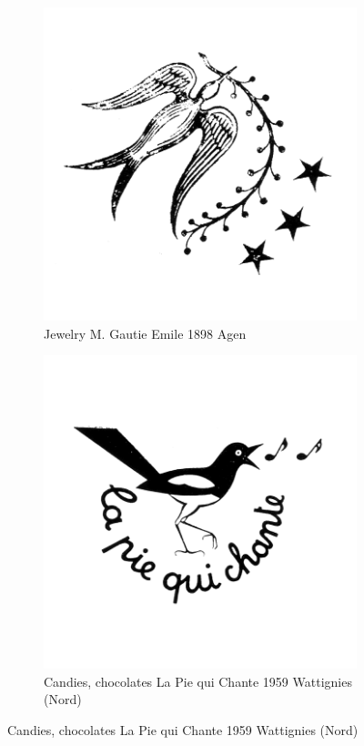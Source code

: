 \begin{figure}[h]
  \begin{subfigure}{.45\textwidth}
    \centering
    \includegraphics[width=.5\linewidth]{images/supplement/trademarks/french/12_2}
    \caption[]{Jewelry M. Gautie Emile 1898 Agen}
    \label{fig:trademarks:french:12.2}
  \end{subfigure}\hfill
  \begin{subfigure}{.45\textwidth}
    \centering
    \includegraphics[width=.5\linewidth]{images/supplement/trademarks/french/12_12}
    \caption[]{Candies, chocolates La Pie qui Chante 1959 Wattignies (Nord)}
    \label{fig:trademarks:french:12.12}
  \end{subfigure}


\end{figure}

